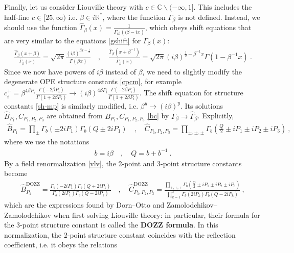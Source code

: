 \documentclass[12pt, a4paper]{article}
\newcommand{\myindex}[1]{\textbf{\boldmath #1}}
\theoremstyle{break}
\begin{document}
Finally, let us consider Liouville theory with $c\in \mathbb{C}\backslash (-\infty,1]$. This includes the half-line $c\in [25,\infty)$ i.e. $\beta\in i\mathbb{R}^*$, where the function $\Gamma_\beta$ is not defined.
Instead, we should use the function $\hat{\Gamma}_\beta(x) = \frac{1}{\Gamma_{i\beta}(i\beta -ix)}$, which obeys shift equations that are very similar to the equations \eqref{gshift} for $\Gamma_\beta(x)$: 
\begin{align}
 \frac{\hat\Gamma_\beta(x+\beta)}{\hat\Gamma_\beta(x)} = \sqrt{2\pi}\frac{(i\beta)^{\beta x-\frac12}}{\Gamma(\beta x)}
\quad , \quad 
\frac{\hat\Gamma_\beta(x+\beta^{-1})}{\hat\Gamma_\beta(x)} = \sqrt{2\pi}(i\beta)^{\frac12-\beta^{-1}x}\Gamma(1-\beta^{-1}x) \ .
\label{hgshift}
\end{align}
Since we now have powers of $i\beta$ instead of $\beta$, we need to slightly modify the degenerate OPE structure constants \eqref{cpcm}, for example $c_i^+ = \beta^{4\beta P_i}\frac{\Gamma(-2\beta P_i)}{\Gamma(1+2\beta P_i)} \to (i\beta)^{4\beta P_i}\frac{\Gamma(-2\beta P_i)}{\Gamma(1+2\beta P_i)}$. The shift equation for structure constants \eqref{sh-mp} is similarly modified, i.e. $\beta^y \to (i\beta)^y$. Its solutions $\hat B_{P_1},\hat C_{P_1,P_2,P_3}$ are obtained from $B_{P_1},C_{P_1,P_2,P_3}$ \eqref{bc} by $\Gamma_\beta \to \hat\Gamma_\beta$. Explicitly,
\begin{align}
 \boxed{\hat B_{P_1} = \prod_\pm \Gamma_b\left(\pm 2iP_1\right)\Gamma_b\left(Q\pm 2iP_1\right)} \quad , \quad 
 \boxed{\hat C_{P_1,P_2,P_3} = \prod_{\pm,\pm,\pm} \Gamma_b\left(\tfrac{Q}{2} \pm iP_1\pm iP_2\pm iP_3\right)}\ ,
 \label{bci}
\end{align}
where we use the notations 
\begin{align}
 b = i\beta \quad , \quad Q = b + b^{-1} \ . 
 \label{bQ}
\end{align}
By a field renormalization \eqref{vlv}, the 2-point and 3-point structure constants become 
\begin{align}
 \hat B^\text{DOZZ}_{P_1} = \frac{\Gamma_b\left(- 2iP_1\right)\Gamma_b\left(Q+ 2iP_1\right)}{\Gamma_b\left( 2iP_1\right)\Gamma_b\left(Q- 2iP_1\right)} \quad , \quad 
 \hat C^\text{DOZZ}_{P_1,P_2,P_3} = \frac{\prod_{\pm,\pm,\pm} \Gamma_b\left(\tfrac{Q}{2} \pm iP_1\pm iP_2\pm iP_3\right)}{\prod_{k=1}^3 \Gamma_b(2iP_k)\Gamma_b(Q-2iP_k)}\ ,
 \label{dozz}
\end{align}
which are the expressions found by Dorn--Otto and Zamolodchikov--Zamolodchikov when first solving Liouville theory: in particular, their formula for the 3-point structure constant is called the \myindex{DOZZ formula}. In this normalization, the 2-point structure constant coincides with the reflection coefficient, i.e. it obeys the relations 
\end{document}
